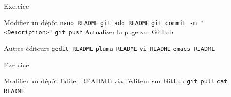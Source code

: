 \documentclass{beamer}
\begin{document}
\begin{frame}[fragile]{Exercice}
  \begin{exampleblock}{Modifier un dépôt}
    \textcolor{commandcolor}{\verb?nano README?}\linebreak
    \textcolor{commandcolor}{\verb?git add README?}\linebreak
    \textcolor{commandcolor}{\verb?git commit -m "<Description>"?}\linebreak
    \textcolor{commandcolor}{\verb?git push?}\linebreak
    Actualiser la page sur GitLab
  \end{exampleblock}
  
  \begin{block}{Autres éditeurs}
    \textcolor{commandcolor}{\verb?gedit README?}\linebreak
    \textcolor{commandcolor}{\verb?pluma README?}\linebreak
    \textcolor{commandcolor}{\verb?vi README?}\linebreak
    \textcolor{commandcolor}{\verb?emacs README?}
  \end{block}
  
\end{frame}

\begin{frame}[fragile]{Exercice}
  \begin{exampleblock}{Modifier un dépôt}
    Editer README via l'éditeur sur GitLab\linebreak
    \textcolor{commandcolor}{\verb?git pull?}\linebreak
    \textcolor{commandcolor}{\verb?cat README?}
  \end{exampleblock}
    
\end{frame}
\end{document}
